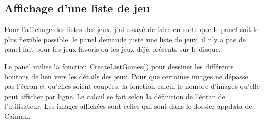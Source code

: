 \documentclass[a4paper,12pt,french]{sphinxmanual}
\begin{document}
\subsection{Affichage d’une liste de jeu}
\label{\detokenize{organique:affichage-dune-liste-de-jeu}}
\sphinxAtStartPar
Pour l’affichage des listes des jeux, j’ai essayé de faire en sorte que le panel soit le plus flexible possible. le panel demande juste une liste de jeux, il n’y a pas de panel fait pour les jeux favoris ou les jeux déjà présents sur le disque.

\sphinxAtStartPar
Le panel utilise la fonction CreateListGames() pour dessiner les différents boutons de lien vers les détails des jeux. Pour que certaines images ne dépasse pas l’écran et qu’elles soient coupées, la fonction calcul le nombre d’images qu’elle peut afficher par ligne. Le calcul se fait selon la définition de l’écran de l’utilisateur. Les images affichées sont celles qui sont dans le dossier appdata de Caiman.
\end{document}
